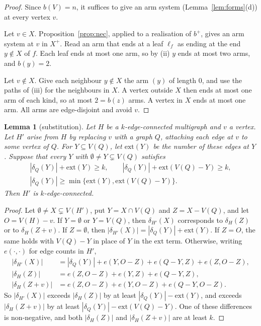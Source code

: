\documentclass[11pt]{amsart}
\newtheorem{lemma}[theorem]{Lemma}
\theoremstyle{definition}
\begin{document}
\begin{proof}
Since $b(V)=n$, it suffices to give an arm system (Lemma~\ref{lem:forms}(d)) at every vertex $v$.

Let $v\in X$. Proposition~\ref{prop:nec}, applied to a realisation of $b^+$, gives an arm system at
$v$ in $X^+$. Read an arm that ends at a leaf $\ell_f$ as ending at the end $y\notin X$ of $f$. Each
leaf ends at most one arm, so by (ii) $y$ ends at most two arms, and $b(y)=2$.

Let $v\notin X$. Give each neighbour $y\notin X$ the arm $(y)$ of length $0$, and use the paths of
(iii) for the neighbours in $X$. A vertex outside $X$ then ends at most one arm of each kind, so at
most $2=b(z)$ arms. A vertex in $X$ ends at most one arm. All arms are edge-disjoint and avoid $v$.
\end{proof}

\begin{lemma}[substitution]\label{lem:subst}
Let $H$ be a $k$-edge-connected multigraph and $v$ a vertex. Let $H'$ arise from $H$ by replacing $v$
with a graph $Q$, attaching each edge at $v$ to some vertex of $Q$. For $Y\subseteq V(Q)$, let
$\mathrm{ext}(Y)$ be the number of these edges at $Y$. Suppose that every $Y$ with
$\emptyset\ne Y\subsetneq V(Q)$ satisfies
\begin{gather*}
|\delta_Q(Y)|+\mathrm{ext}(Y)\ge k,\qquad |\delta_Q(Y)|+\mathrm{ext}(V(Q)-Y)\ge k,\\
|\delta_Q(Y)|\ge\min\{\mathrm{ext}(Y),\mathrm{ext}(V(Q)-Y)\}.
\end{gather*}
Then $H'$ is $k$-edge-connected.
\end{lemma}

\begin{proof}
Let $\emptyset\ne X\subsetneq V(H')$, put $Y=X\cap V(Q)$ and $Z=X-V(Q)$, and let $O=V(H)-v$. If
$Y=\emptyset$ or $Y=V(Q)$, then $\delta_{H'}(X)$ corresponds to $\delta_H(Z)$ or to $\delta_H(Z+v)$. If
$Z=\emptyset$, then $|\delta_{H'}(X)|=|\delta_Q(Y)|+\mathrm{ext}(Y)$. If $Z=O$, the same holds with
$V(Q)-Y$ in place of $Y$ in the $\mathrm{ext}$ term. Otherwise, writing $e(\cdot,\cdot)$ for edge
counts in $H'$,
\begin{align*}
|\delta_{H'}(X)|&=|\delta_Q(Y)|+e(Y,O-Z)+e(Q-Y,Z)+e(Z,O-Z),\\
|\delta_H(Z)|&=e(Z,O-Z)+e(Y,Z)+e(Q-Y,Z),\\
|\delta_H(Z+v)|&=e(Z,O-Z)+e(Y,O-Z)+e(Q-Y,O-Z).
\end{align*}
So $|\delta_{H'}(X)|$ exceeds $|\delta_H(Z)|$ by at least $|\delta_Q(Y)|-\mathrm{ext}(Y)$, and exceeds
$|\delta_H(Z+v)|$ by at least $|\delta_Q(Y)|-\mathrm{ext}(V(Q)-Y)$. One of these differences is
non-negative, and both $|\delta_H(Z)|$ and $|\delta_H(Z+v)|$ are at least $k$.
\end{proof}
\end{document}
